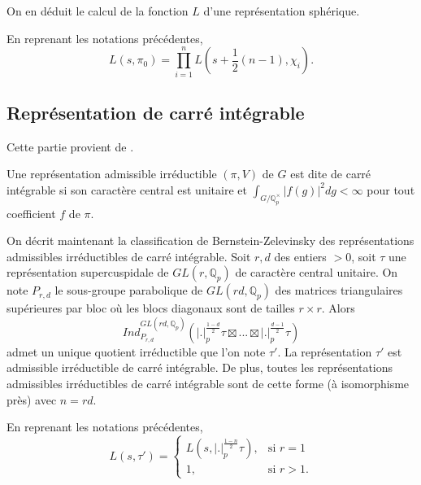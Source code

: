 On en déduit le calcul de la fonction $L$ d'une représentation sphérique.
\begin{proposition}
En reprenant les notations précédentes,
\begin{equation}
L(s, \pi_0) = \prod_{i=1}^n L(s+\frac{1}{2}(n-1), \chi_i).
\end{equation}
\end{proposition}

\subsection{Représentation de carré intégrable}

Cette partie provient de \cite{goldfeld-hundley}.
\begin{definition}
Une représentation admissible irréductible $(\pi, V)$ de $G$ est dite de carré intégrable si son caractère central est unitaire et $\int_{G/\mathbb{Q}_p^\times} |f(g)|^2 dg < \infty$ pour tout coefficient $f$ de $\pi$.
\end{definition}

On décrit maintenant la classification de Bernstein-Zelevinsky des représentations admissibles irréductibles de carré intégrable. Soit $r,d$ des entiers $> 0$, soit $\tau$ une représentation supercuspidale de $GL(r, \mathbb{Q}_p)$ de caractère central unitaire. On note $P_{r,d}$ le sous-groupe parabolique de $GL(rd, \mathbb{Q}_p)$ des matrices triangulaires supérieures par bloc où les blocs diagonaux sont de tailles $r \times r$. Alors
\begin{equation}
Ind_{P_{r,d}}^{GL(rd, \mathbb{Q}_p)}(|.|_p^{\frac{1-d}{2}}\tau \boxtimes ... \boxtimes |.|_p^{\frac{d-1}{2}}\tau)
\end{equation}
admet un unique quotient irréductible que l'on note $\tau'$. La représentation $\tau'$ est admissible irréductible de carré intégrable. De plus, toutes les représentations admissibles irréductibles de carré intégrable sont de cette forme (à isomorphisme près) avec $n=rd$.

\begin{proposition}
En reprenant les notations précédentes,
\begin{equation}
L(s, \tau') = \begin{cases}
    L(s,|.|_p^{\frac{1-n}{2}}\tau),& \text{si } r=1\\
    1,              & \text{si } r > 1.
\end{cases}
\end{equation}
\end{proposition}

